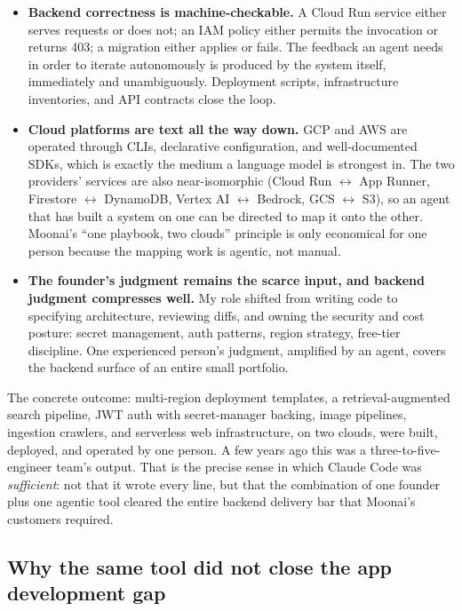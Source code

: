 \documentclass{article}
\begin{document}
\begin{itemize}
    \item \textbf{Backend correctness is machine-checkable.} A Cloud Run service either serves requests or does not; an IAM policy either permits the invocation or returns 403; a migration either applies or fails. The feedback an agent needs in order to iterate autonomously is produced by the system itself, immediately and unambiguously. Deployment scripts, infrastructure inventories, and API contracts close the loop.
    \item \textbf{Cloud platforms are text all the way down.} GCP and AWS are operated through CLIs, declarative configuration, and well-documented SDKs, which is exactly the medium a language model is strongest in. The two providers' services are also near-isomorphic (Cloud Run $\leftrightarrow$ App Runner, Firestore $\leftrightarrow$ DynamoDB, Vertex AI $\leftrightarrow$ Bedrock, GCS $\leftrightarrow$ S3), so an agent that has built a system on one can be directed to map it onto the other. Moonai's ``one playbook, two clouds'' principle is only economical for one person because the mapping work is agentic, not manual.
    \item \textbf{The founder's judgment remains the scarce input, and backend judgment compresses well.} My role shifted from writing code to specifying architecture, reviewing diffs, and owning the security and cost posture: secret management, auth patterns, region strategy, free-tier discipline. One experienced person's judgment, amplified by an agent, covers the backend surface of an entire small portfolio.
\end{itemize}

The concrete outcome: multi-region deployment templates, a retrieval-augmented search pipeline, JWT auth with secret-manager backing, image pipelines, ingestion crawlers, and serverless web infrastructure, on two clouds, were built, deployed, and operated by one person. A few years ago this was a three-to-five-engineer team's output. That is the precise sense in which Claude Code was \emph{sufficient}: not that it wrote every line, but that the combination of one founder plus one agentic tool cleared the entire backend delivery bar that Moonai's customers required.

\subsection{Why the same tool did not close the app development gap}
\end{document}
